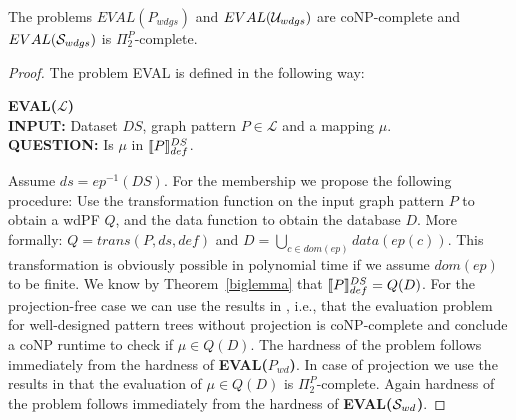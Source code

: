 \begin{corollary}
	The problems $EVAL(P_{wdgs})$ and $EVAL(\mathcal{U}_{wdgs})$ are coNP-complete and
	$EVAL(\mathcal{S}_{wdgs})$ is $\Pi^P_2$-complete.
\end{corollary}
\begin{proof}
The problem EVAL is defined in the following way:
\begin{framed}\noindent \textbf{EVAL($\mathcal{L}$)}\\
	\textbf{INPUT:} Dataset $DS$, graph pattern $P \in  \mathcal{L}$ and a mapping $\mu$.\\
	\textbf{QUESTION:} Is $\mu$ in $\llbracket P \rrbracket^{DS}_{def}$.
\end{framed}
Assume $ds = ep^{-1}(DS)$. %
For the membership we propose the following procedure:
Use the transformation function on the input graph pattern $P$ to obtain a wdPF
$Q$, and the data function to obtain the database $D$. More formally:
$Q = trans(P,ds,def)$ and $D = \bigcup\limits_{c\in dom(ep)} data(ep(c))$. This transformation is obviously
possible in polynomial time if we assume $dom(ep)$ to be finite. We know by Theorem~\ref{biglemma} that 
$\llbracket P \rrbracket^{DS}_{def} = Q(D)$.
For the projection-free case we can use the results in 
\cite{perez2009semantics}, i.e., that the evaluation problem for well-designed
pattern trees without projection is coNP-complete and conclude a coNP runtime to
check if $\mu \in Q(D)$.
The hardness of the problem follows immediately from the hardness of
\textbf{EVAL($P_{wd}$)}.
In case of projection we use the results in \cite{letelier2013static}
that the evaluation of $\mu \in Q(D)$ is $\Pi^P_2$-complete.
Again hardness of the problem follows immediately from the hardness of 
\textbf{EVAL($\mathcal{S}_{wd}$)}.
\end{proof}


